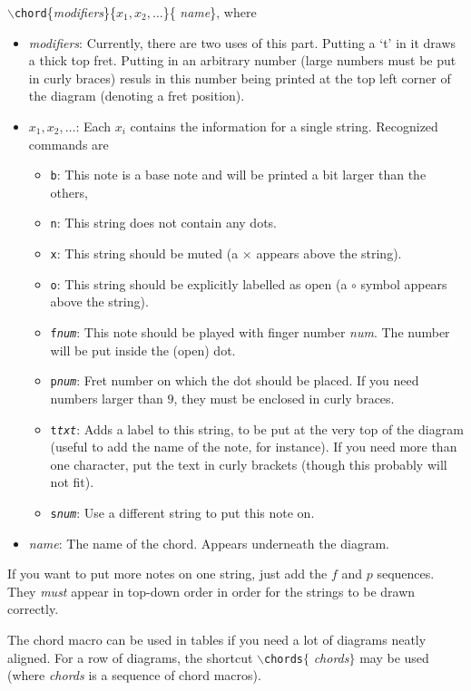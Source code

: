 \documentclass{article}
\begin{document}
\bigskip
{$\backslash${\tt chord}\{{\it modifiers}\/\}\{$x_1,x_2,\ldots$\}\{{\it
name}\/\}}, where
\begin{itemize}
\item {\it modifiers}\/: Currently, there are two uses of this part.
Putting a `t' in it draws a thick top fret. Putting in an arbitrary number
(large numbers must be put in curly braces) resuls in this number being
printed at the top left corner of the diagram (denoting a fret position).
\item $x_1,x_2,\ldots$: Each $x_i$ contains the information for a single
string. Recognized commands are
\begin{itemize}
\item {\tt b}: This note is a base note and will be printed a bit larger
than the others,
\item {\tt n}: This string does not contain any dots.
\item {\tt x}: This string should be muted (a $\times$ appears above the
string).
\item {\tt o}: This string should be explicitly labelled as open (a
  $\circ$ symbol appears above the
string).
\item {\tt f{\it num}\/}: This note should be played with finger number
{\it num}\/. The number will be put inside the (open) dot.
\item {\tt p{\it num}\/}: Fret number on which the dot should be
placed. If you need numbers larger than $9$, they must be enclosed in
curly braces.
\item {\tt t{\it txt}\/}: Adds a label to this string, to be put at
  the very top of the diagram (useful to add the name of the note, for
  instance). If you need more than one character, put the text in
  curly brackets (though this probably will not fit).
\item {\tt s{\it num}\/}: Use a different string to put this note on.
\end{itemize}
\item {\it name}\/: The name of the chord. Appears underneath the diagram.
\end{itemize}
If you want to put more notes on one string, just add the $f$ and $p$
sequences. They {\em must}\/ appear in top-down order in order for the
strings to be drawn correctly.

The chord macro can be used in tables if you need a lot of diagrams neatly
aligned. For a row of diagrams, the shortcut {$\backslash$\texttt{chords}$\{$
\textit{chords}$\}$} may be used (where {\it chords}\/ is a sequence of chord
macros).
\end{document}
